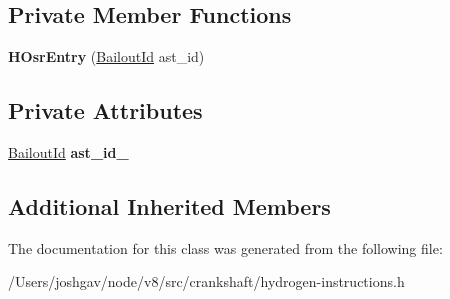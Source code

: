 \subsection*{Private Member Functions}
\begin{DoxyCompactItemize}
\item 
{\bfseries H\+Osr\+Entry} (\hyperlink{classv8_1_1internal_1_1_bailout_id}{Bailout\+Id} ast\+\_\+id)\hypertarget{classv8_1_1internal_1_1_h_osr_entry_ae76954b9c6918f0ee3d80a4a24f69c06}{}\label{classv8_1_1internal_1_1_h_osr_entry_ae76954b9c6918f0ee3d80a4a24f69c06}

\end{DoxyCompactItemize}
\subsection*{Private Attributes}
\begin{DoxyCompactItemize}
\item 
\hyperlink{classv8_1_1internal_1_1_bailout_id}{Bailout\+Id} {\bfseries ast\+\_\+id\+\_\+}\hypertarget{classv8_1_1internal_1_1_h_osr_entry_a529f5e6b4719ca0babdc6723356bc649}{}\label{classv8_1_1internal_1_1_h_osr_entry_a529f5e6b4719ca0babdc6723356bc649}

\end{DoxyCompactItemize}
\subsection*{Additional Inherited Members}


The documentation for this class was generated from the following file\+:\begin{DoxyCompactItemize}
\item 
/\+Users/joshgav/node/v8/src/crankshaft/hydrogen-\/instructions.\+h\end{DoxyCompactItemize}
